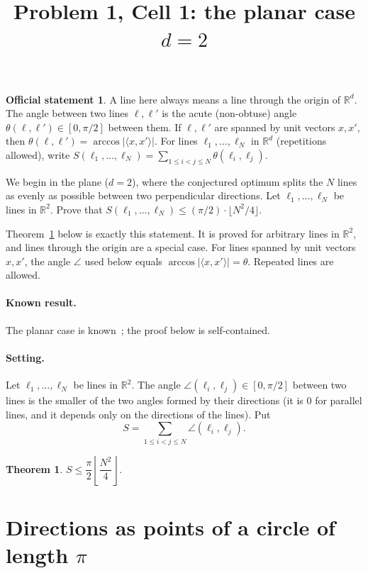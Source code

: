 \documentclass[11pt]{article}
\title{Problem 1, Cell 1: the planar case $d=2$}
\author{}
\date{}
\newtheorem{theorem}{Theorem}
\theoremstyle{definition}
\theoremstyle{remark}
\theoremstyle{definition}
\newtheorem*{statement}{Official statement}
\begin{document}
\maketitle

\begin{statement}
A line here always means a line through the origin of $\mathbb{R}^d$. The angle between two lines
$\ell,\ell'$ is the acute (non-obtuse) angle $\theta(\ell,\ell')\in[0,\pi/2]$ between them. If
$\ell,\ell'$ are spanned by unit vectors $x,x'$, then $\theta(\ell,\ell')=\arccos|\langle x,x'\rangle|$.
For lines $\ell_1,\dots,\ell_N$ in $\mathbb{R}^d$ (repetitions allowed), write
$S(\ell_1,\dots,\ell_N)=\sum_{1\le i<j\le N}\theta(\ell_i,\ell_j)$.

We begin in the plane ($d=2$), where the conjectured optimum splits the $N$ lines as evenly as
possible between two perpendicular directions. Let $\ell_1,\dots,\ell_N$ be lines in $\mathbb{R}^2$.
Prove that $S(\ell_1,\dots,\ell_N)\le(\pi/2)\cdot\lfloor N^2/4\rfloor$.
\end{statement}

\noindent Theorem~\ref{thm:main} below is exactly this statement. It is proved for arbitrary lines in
$\mathbb{R}^2$, and lines through the origin are a special case. For lines spanned by unit vectors
$x,x'$, the angle $\angle$ used below equals $\arccos|\langle x,x'\rangle|=\theta$. Repeated lines are
allowed.

\paragraph{Known result.} The planar case is known~\cite{FVZ16,BM19}; the proof below is
self-contained.

\paragraph{Setting.}
Let $\ell_1,\dots,\ell_N$ be lines in $\mathbb{R}^2$. The angle $\angle(\ell_i,\ell_j)\in[0,\pi/2]$
between two lines is the smaller of the two angles formed by their directions (it is $0$ for
parallel lines, and it depends only on the directions of the lines). Put
\[
  S=\sum_{1\le i<j\le N}\angle(\ell_i,\ell_j).
\]

\begin{theorem}\label{thm:main}
$S\le \dfrac{\pi}{2}\left\lfloor \dfrac{N^2}{4}\right\rfloor$.
\end{theorem}

\section{Directions as points of a circle of length $\pi$}
\end{document}
